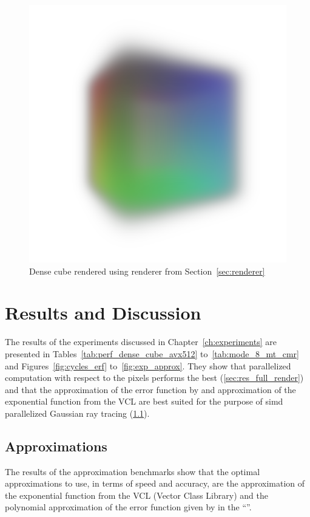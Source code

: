 \documentclass[a4paper, 11pt]{memoir}
\begin{document}
    \begin{figure}[t]
        \centering
        \includegraphics[scale=.2]{images/cube.png}
        \caption{Dense cube rendered using renderer from Section~\ref{sec:renderer}}
        \label{fig:cube_render}
    \end{figure}
    
    \chapter{Results and Discussion}
    \label{ch:results}

    The results of the experiments discussed in Chapter~\ref{ch:experiments} are presented in Tables~\ref{tab:perf_dense_cube_avx512}
    to~\ref{tab:mode_8_mt_cmr} and Figures~\ref{fig:cycles_erf} to~\ref{fig:exp_approx}. They show that parallelized
    computation with respect to the pixels performs the best (\ref{sec:res_full_render}) and that the approximation of
    the error function by \citeauthor{AbraSteg72} and approximation of the exponential function from the VCL are best
    suited for the purpose of \gls{simd} parallelized Gaussian ray tracing (\ref{sec:res_approx}).

    \section{Approximations}
    \label{sec:res_approx}
    The results of the approximation benchmarks show that the optimal approximations to use, in terms of speed and
    accuracy, are the approximation of the exponential function from the VCL (Vector Class Library) and the polynomial
    approximation of the error function given by \citeauthor{AbraSteg72} in the \enquote{}.
\end{document}
